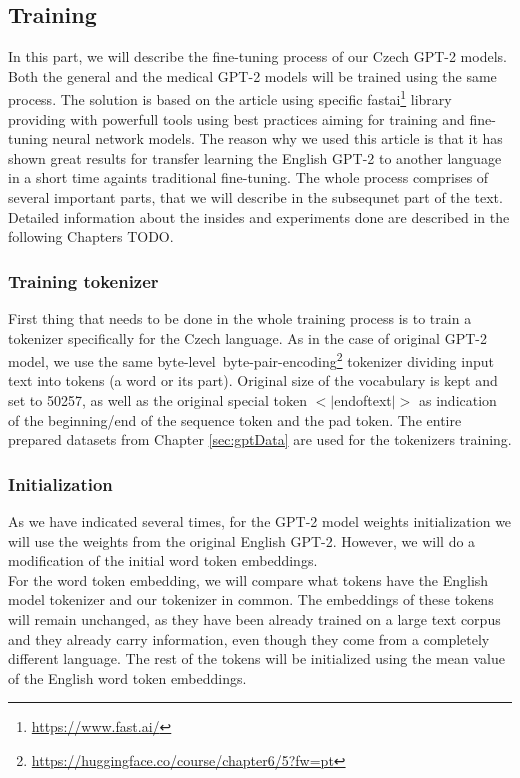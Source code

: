 \subsection{Training}
In this part, we will describe the fine-tuning process of our Czech GPT-2 models. Both the general and the medical GPT-2 models will be trained using the same process. The solution is based on the \citet{guillou2020faster} article using specific fastai\footnote[6]{\url{https://www.fast.ai/}} library providing with powerfull tools using best practices aiming for training and fine-tuning neural network models. The reason why we used this article is that it has shown great results for transfer learning the English GPT-2 to another language in a short time againts traditional fine-tuning. The whole process comprises of several important parts, that we will describe in the subsequnet part of the text. Detailed information about the insides and experiments done are described in the following Chapters TODO.

\subsubsection*{Training tokenizer}
First thing that needs to be done in the whole training process is to train a tokenizer specifically for the Czech language. As in the case of original GPT-2 model, we use the same byte-level~byte-pair-encoding\footnote[7]{\url{https://huggingface.co/course/chapter6/5?fw=pt}} tokenizer dividing input text into tokens (a word or its part). Original size of the vocabulary is kept and set to 50257, as well as the original special token $<|$endoftext$|>$ as indication of the beginning/end of the sequence token and the pad token. The entire prepared datasets from Chapter \ref{sec:gptData} are used for the tokenizers training.

\subsubsection*{Initialization}
As we have indicated several times, for the GPT-2 model weights initialization we will use the weights from the original English GPT-2. However, we will do a modification of the initial word token embeddings.\\

For the word token embedding, we will compare what tokens have the English model tokenizer and our tokenizer in common. The embeddings of these tokens will remain unchanged, as they have been already trained on a large text corpus and they already carry information, even though they come from a completely different language. The rest of the tokens will be initialized using the mean value of the English word token embeddings.

